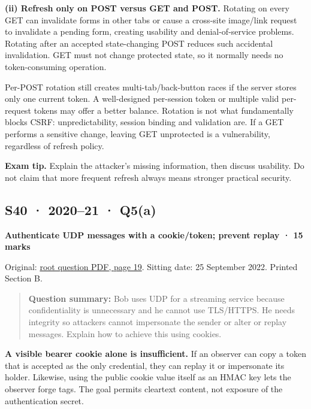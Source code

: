 \documentclass[11pt,a4paper]{article}
\begin{document}
\textbf{(ii) Refresh only on POST versus GET and POST.} Rotating on every GET can invalidate forms in other tabs or cause a cross-site image/\allowbreak{}link request to invalidate a pending form,\allowbreak{} creating usability and denial-of-service problems. Rotating after an accepted state-changing POST reduces such accidental invalidation. GET must not change protected state,\allowbreak{} so it normally needs no token-consuming operation.


Per-POST rotation still creates multi-tab/\allowbreak{}back-button races if the server stores only one current token. A well-designed per-session token or multiple valid per-request tokens may offer a better balance. Rotation is not what fundamentally blocks CSRF: unpredictability,\allowbreak{} session binding and validation are. If a GET performs a sensitive change,\allowbreak{} leaving GET unprotected is a vulnerability,\allowbreak{} regardless of refresh policy.



{\color{ForestGreen}\textbf{Exam tip.} Explain the attacker’s missing information,\allowbreak{} then discuss usability. Do not claim that more frequent refresh always means stronger practical security.}




\clearpage
\subsection{S40 · 2020–21 · Q5(a)}\label{s40}

\textbf{Authenticate UDP messages with a cookie/\allowbreak{}token; prevent replay · 15 marks}


Original: \href{../../CSE405-Security_Merged.pdf\#page=19}{root question PDF,\allowbreak{} page 19}. Sitting date: 25 September 2022. Printed Section B.



\begin{quote}\small

\textbf{Question summary:} Bob uses UDP for a streaming service because confidentiality is unnecessary and he cannot use TLS/\allowbreak{}HTTPS. He needs integrity so attackers cannot impersonate the sender or alter or replay messages. Explain how to achieve this using cookies.



\end{quote}

\textbf{A visible bearer cookie alone is insufficient.} If an observer can copy a token that is accepted as the only credential,\allowbreak{} they can replay it or impersonate its holder. Likewise,\allowbreak{} using the public cookie value itself as an HMAC key lets the observer forge tags. The goal permits cleartext content,\allowbreak{} not exposure of the authentication secret.
\end{document}
